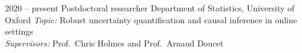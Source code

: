 \documentclass[9pt]{developercv} %
\begin{document}
\begin{minipage}[t]{\textwidth}

\end{minipage}

\vspace{.5cm}




\begin{entrylist}
    \entry
    {2020 -- present}
    {Postdoctoral researcher}
    {Department of Statistics, University of Oxford}
    {\textit{Topic:} Robust uncertainty quantification and causal inference in online settings \\
    \textit{Supervisors:} Prof.\ Chris Holmes and Prof.\ Arnaud Doucet}
\end{entrylist}
\end{document}
